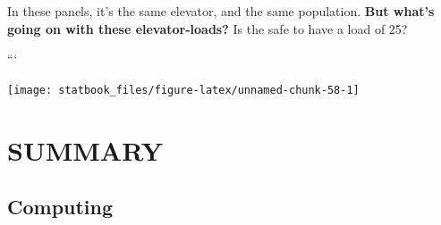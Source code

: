 \documentclass[]{book}
\begin{document}
In these panels, it's the same elevator, and the same population. \textbf{But what's going on with these elevator-loads?} Is the safe to have a load of 25?

```

\begin{center}\texttt{[image: statbook\_files/figure-latex/unnamed-chunk-58-1]} \end{center}

\hypertarget{summary-3}{%
\section{SUMMARY}\label{summary-3}}

\hypertarget{computing-1}{%
\subsection{Computing}\label{computing-1}}
\end{document}
